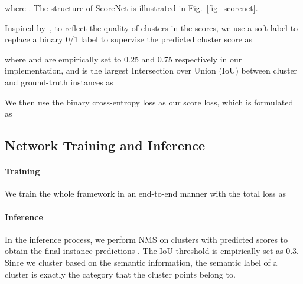 \documentclass[10pt,twocolumn,letterpaper]{article}
\begin{document}
where .
The structure of ScoreNet is illustrated in Fig.~\ref{fig_scorenet}.

Inspired by~\cite{li2019gs3d, jiang2018acquisition}, to reflect the quality of clusters in the scores, we use a soft label to replace a binary 0/1 label to supervise the predicted cluster score as

where  and  are empirically set to 0.25 and 0.75 respectively in our implementation, and 
 is the largest Intersection over Union (IoU) between cluster  and ground-truth instances as

We then use the binary cross-entropy loss as our score loss, which is formulated as




\subsection{Network Training and Inference}

\paragraph{Training}
We train the whole framework in an end-to-end manner with the total loss as


\paragraph{Inference}
In the inference process, we perform NMS on clusters  with predicted scores  to obtain the final instance predictions . The IoU threshold is empirically set as 0.3. Since we cluster based on the semantic information, the semantic label of a cluster is exactly the category that the cluster points belong to. 
\end{document}
